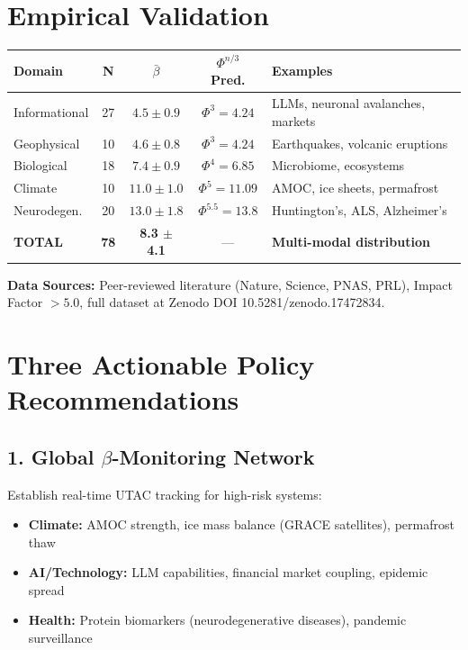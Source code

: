 \documentclass[11pt,a4paper]{article}
\begin{document}
\section*{Empirical Validation}

\begin{center}
\begin{tabular}{lcccl}
\toprule
\textbf{Domain} & \textbf{N} & \textbf{$\bar{\beta}$} & \textbf{$\Phi^{n/3}$ Pred.} & \textbf{Examples} \\
\midrule
Informational & 27 & $4.5 \pm 0.9$ & $\Phi^3 = 4.24$ & LLMs, neuronal avalanches, markets \\
Geophysical & 10 & $4.6 \pm 0.8$ & $\Phi^3 = 4.24$ & Earthquakes, volcanic eruptions \\
Biological & 18 & $7.4 \pm 0.9$ & $\Phi^4 = 6.85$ & Microbiome, ecosystems \\
Climate & 10 & $11.0 \pm 1.0$ & $\Phi^5 = 11.09$ & AMOC, ice sheets, permafrost \\
Neurodegen. & 20 & $13.0 \pm 1.8$ & $\Phi^{5.5} = 13.8$ & Huntington's, ALS, Alzheimer's \\
\midrule
\textbf{TOTAL} & \textbf{78} & \textbf{8.3 $\pm$ 4.1} & --- & \textbf{Multi-modal distribution} \\
\bottomrule
\end{tabular}
\end{center}

\textbf{Data Sources:} Peer-reviewed literature (Nature, Science, PNAS, PRL), Impact Factor $> 5.0$, full dataset at Zenodo DOI 10.5281/zenodo.17472834.

\section*{Three Actionable Policy Recommendations}

\subsection*{1. Global $\beta$-Monitoring Network}

Establish real-time UTAC tracking for high-risk systems:
\begin{itemize}
\item \textbf{Climate:} AMOC strength, ice mass balance (GRACE satellites), permafrost thaw
\item \textbf{AI/Technology:} LLM capabilities, financial market coupling, epidemic spread
\item \textbf{Health:} Protein biomarkers (neurodegenerative diseases), pandemic surveillance
\end{itemize}
\end{document}
